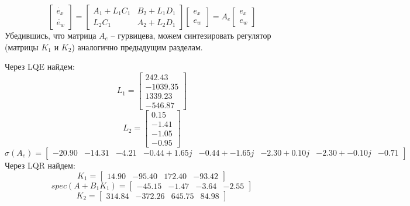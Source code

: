 \[
    \begin{bmatrix}
        \dot{e_x} \\
        \dot{e_w}
    \end{bmatrix} = 
    \begin{bmatrix}
        A_1 + L_1C_1 & B_2 + L_1D_1 \\
        L_2C_1 & A_2 + L_2D_1
    \end{bmatrix}
    \begin{bmatrix}
        e_x \\
        e_w
    \end{bmatrix} = A_e 
    \begin{bmatrix}
        e_x \\
        e_w
    \end{bmatrix}
\] 
Убедившись, что матрица \(A_e\) -- гурвицева, можем синтезировать регулятор (матрицы $K_1$ и $K_2$) аналогично предыдущим разделам.

Через LQE найдем:
\[L_1 = \begin{bmatrix}
    242.43\\
   -1039.35\\
    1339.23\\
   -546.87
  \end{bmatrix}\]
  \[L_2 = \begin{bmatrix}
    0.15\\
   -1.41\\
   -1.05\\
   -0.95
  \end{bmatrix}\]
  \[\sigma (A_e) = \begin{bmatrix}
   -20.90 & -14.31 & -4.21 & -0.44 + 1.65j & -0.44 + -1.65j & -2.30 + 0.10j & -2.30 + -0.10j & -0.71
  \end{bmatrix}\]
Через LQR найдем:
\[K_1 = \begin{bmatrix}
    14.90 & -95.40 &  172.40 & -93.42
  \end{bmatrix}\]
  \[spec(A + B_1 K_1) = \begin{bmatrix}
   -45.15 & -1.47 & -3.64 & -2.55
  \end{bmatrix}\]
  \[K_2 = \begin{bmatrix}
    314.84 & -372.26 &  645.75 &  84.98
  \end{bmatrix}\]

